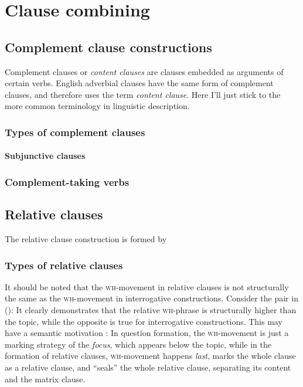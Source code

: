 \documentclass[UTF8, a4paper, oneside, scheme=plain]{ctexrep}
\newcommand*{\citepage}[1]{pp.~{#1}}
\newcommand*{\term}[1]{\emph{#1}}
\newcommand{\corpuscat}[1]{\textsc{#1}}
\begin{document}
\chapter{Clause combining}\label{chap:clause-combining}

\section{Complement clause constructions}\label{chap:complement-clause}

Complement clauses or \term{content clauses} \citep{cgel} are clauses embedded as arguments of certain verbs.
English adverbial clauses have the same form of complement clauses,
and therefore \citet{cgel} uses the term \term{content clause}.
Here I'll just stick to the more common terminology in linguistic description.

\subsection{Types of complement clauses}

\subsubsection{Subjunctive clauses}\label{sec:complement.subjunctive}

\subsection{Complement-taking verbs}

\section{Relative clauses}\label{sec:relative-clause}

The relative clause construction is formed by 

\subsection{Types of relative clauses}

It should be noted that the \corpuscat{wh}-movement in relative clauses 
is not structurally the same as the \corpuscat{wh}-movement in interrogative constructions.
Consider the pair in ():
It clearly demonstrates that the relative \corpuscat{wh}-phrase 
is structurally higher than the topic,
while the opposite is true for interrogative constructions.
This may have a semantic motivation \citet[\citepage{330}]{radford2009analysing}:
In question formation, the \corpuscat{wh}-movement is just a marking strategy of the \emph{focus},
which appears below the topic,
while in the formation of relative clauses,
\corpuscat{wh}-movement happens \emph{last},
marks the whole clause as a relative clause, 
and ``seals'' the whole relative clause,
separating its content and the matrix clause.
\end{document}
